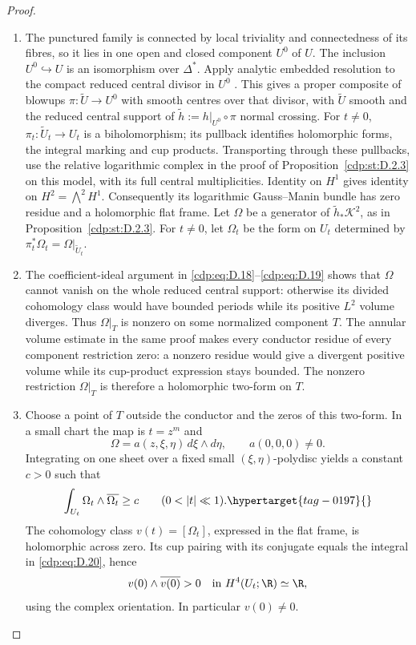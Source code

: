 \begin{proof}

\begin{enumerate}[leftmargin=*]
\item The punctured family is connected by local triviality and connectedness
of its fibres, so it lies in one open and closed component $U^0$ of $U$.
The inclusion $U^0\hookrightarrow U$ is an isomorphism over $\Delta^*$.
Apply analytic embedded resolution to the compact reduced central divisor
in $U^0$ \cite[\S0.2(2), preprint p.~3; Theorem~1.6 and Remarks~1.7,
preprint pp.~5--6]{BierstoneMilman1997}. This gives a proper composite
of blowups $\pi:\widetilde U\to U^0$ with smooth centres over that
divisor, with $\widetilde U$ smooth and the reduced central support
of $\widetilde h:=h|_{U^0}\circ\pi$ normal crossing. For $t\ne0$,
$\pi_t:\widetilde U_t\to U_t$ is a biholomorphism;
its pullback identifies holomorphic forms, the integral marking and
cup products. Transporting through these pullbacks, use the relative
logarithmic complex in the proof of Proposition~\ref{cdp:st:D.2.3}
on this model, with its full central multiplicities.
Identity on $H^1$ gives identity on $H^2=\bigwedge^2H^1$.
Consequently its logarithmic Gauss--Manin bundle has zero
residue and a holomorphic flat frame. Let $\Omega$ be a
generator of $\widetilde h_*\mathscr K^2$, as in Proposition~\ref{cdp:st:D.2.3}.
For $t\ne0$, let $\Omega_t$ be the form on $U_t$ determined by
$\pi_t^*\Omega_t=\Omega|_{\widetilde U_t}$.

\item The coefficient-ideal argument in
\eqref{cdp:eq:D.18}--\eqref{cdp:eq:D.19} shows that $\Omega$
cannot vanish on the whole reduced central support: otherwise
its divided cohomology class would have bounded periods while
its positive $L^2$ volume diverges. Thus $\Omega|_T$ is nonzero
on some normalized component $T$. The annular volume estimate
in the same proof makes every conductor residue of every
component restriction zero: a nonzero residue would give a
divergent positive volume while its cup-product expression
stays bounded. The nonzero restriction $\Omega|_T$ is therefore
a holomorphic two-form on $T$.

\item Choose a point of $T$ outside the conductor and the zeros of
this two-form. In a small chart the map is $t=z^m$ and
\[
 \Omega=a(z,\xi,\eta)\,d\xi\wedge d\eta,
 \qquad a(0,0,0)\ne0.
\]
Integrating on one sheet over a fixed small
$(\xi,\eta)$-polydisc yields a constant $c>0$ such that
\begin{equation}
 \int_{U_t}\Omega_t\wedge\overline{\Omega_t}\ge c
 \qquad(0<|t|\ll1).
\hypertarget{tag-0197}{}\label{cdp:eq:D.20}
\end{equation}
The cohomology class $v(t)=[\Omega_t]$, expressed in the flat
frame, is holomorphic across zero. Its cup pairing with its conjugate equals the
integral in \eqref{cdp:eq:D.20}, hence
\[
 v(0)\wedge\overline{v(0)}>0
 \quad\hbox{in }H^4(U_t;\R)\simeq\R,
\]
using the complex orientation. In particular $v(0)\ne0$.


\end{enumerate}
\end{proof}
